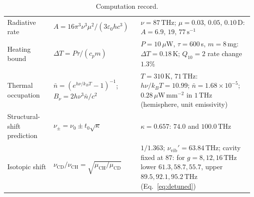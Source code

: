 \documentclass[11pt]{article}
\newcommand{\thz}{\,\mathrm{THz}}
\theoremstyle{plain}
\theoremstyle{definition}
\theoremstyle{remark}
\begin{document}
\begin{table}[ht]
\begin{tabularx}{\textwidth}{@{}p{3.3cm}p{4.2cm}X@{}}
Radiative rate & $A=16\pi^3\nu^3\mu^2/(3\varepsilon_0hc^3)$ & $\nu=87\thz$; $\mu=0.03$, $0.05$, $0.10$\,D: $A=6.9$, $19$, $77\,\mathrm{s^{-1}}$ \\
Heating bound & $\Delta T=P\tau/(c_p m)$ & $P=10\,\mu$W, $\tau=600$\,s, $m=8$\,mg: $\Delta T=0.18$\,K; $Q_{10}=2$ rate change $1.3\%$ \\
Thermal occupation & $\bar n=(e^{h\nu/k_BT}-1)^{-1}$; $B_\nu=2h\nu^3\bar n/c^2$ & $T=310$\,K, $71\thz$: $h\nu/k_BT=10.99$; $\bar n=1.68\times10^{-5}$; $0.28\,\mu\mathrm{W\,mm^{-2}}$ in $1\thz$ (hemisphere, unit emissivity) \\
Structural-shift prediction & $\nu_\pm=\nu_0\pm t_0\sqrt\kappa$ & $\kappa=0.657$: $74.0$ and $100.0\thz$ \\
Isotopic shift & $\nu_{\mathrm{CD}}/\nu_{\mathrm{CH}}=\sqrt{\mu_{\mathrm{CH}}/\mu_{\mathrm{CD}}}$ & $1/1.363$; $\nu_{\mathrm{vib}}'=63.84\thz$; cavity fixed at $87$: for $g=8,12,16\thz$ lower $61.3,58.7,55.7$, upper $89.5,92.1,95.2\thz$ (Eq.~\ref{eq:detuned}) \\
\bottomrule
\end{tabularx}
\caption{Computation record.}
\end{table}
\end{document}
